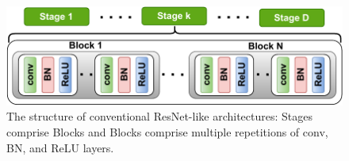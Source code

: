 \begin{figure}[htbp] \centering
\includegraphics[scale=0.55]{Figures/NetHierarchy}
\vspace{-1em}
\caption{The structure of conventional ResNet-like architectures: %
Stages comprise Blocks and Blocks comprise multiple repetitions of conv, BN, and ReLU layers. 
}
\vspace{-1em}
\label{fig:NetHierarchy}
\end{figure}